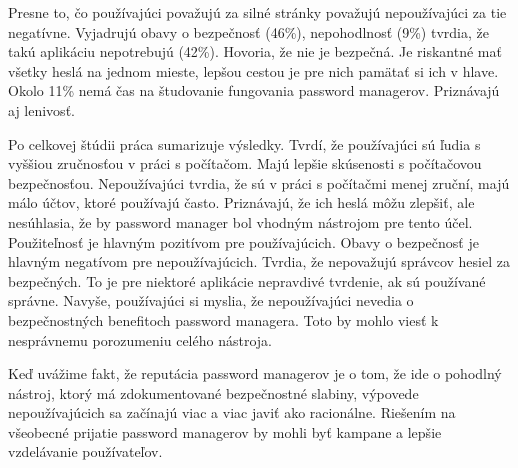 Presne to, čo používajúci považujú za silné stránky považujú nepoužívajúci za tie negatívne. Vyjadrujú obavy o bezpečnosť (46\%), nepohodlnosť (9\%) tvrdia, že takú aplikáciu nepotrebujú (42\%). Hovoria, že nie je bezpečná. Je riskantné mať všetky heslá na jednom mieste, lepšou cestou je pre nich pamätať si ich v hlave. Okolo 11\% nemá čas na študovanie fungovania password managerov. Priznávajú aj lenivosť. 

Po celkovej štúdii práca sumarizuje výsledky. Tvrdí, že používajúci sú ľudia s vyššiou zručnosťou v práci s počítačom. Majú lepšie skúsenosti s počítačovou bezpečnosťou. Nepoužívajúci tvrdia, že sú v práci s počítačmi menej zruční, majú málo účtov, ktoré používajú často. Priznávajú, že ich heslá môžu zlepšiť, ale nesúhlasia, že by password manager bol vhodným nástrojom pre tento účel. Použiteľnosť je hlavným pozitívom pre používajúcich. Obavy o bezpečnosť je hlavným negatívom pre nepoužívajúcich. Tvrdia, že nepovažujú správcov hesiel za bezpečných. To je pre niektoré aplikácie nepravdivé tvrdenie, ak sú používané správne. Navyše, používajúci si myslia, že nepoužívajúci nevedia o bezpečnostných benefitoch password managera. Toto by mohlo viesť k nesprávnemu porozumeniu celého nástroja.

Keď uvážime fakt, že reputácia password managerov je o tom, že ide o pohodlný nástroj, ktorý má zdokumentované bezpečnostné slabiny, výpovede nepoužívajúcich sa začínajú viac a viac javiť ako racionálne. Riešením na všeobecné prijatie password managerov by mohli byť kampane a lepšie vzdelávanie používateľov.